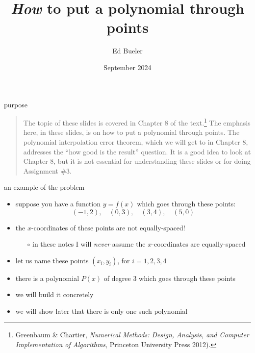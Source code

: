 \documentclass[10pt,hyperref]{beamer}
\title{\emph{How} to put a polynomial through points}
\author{Ed Bueler}
\institute{MATH 426 Numerical Analysis}
\date{September 2024}
\date{}
\begin{document}
\begin{frame}
  \maketitle
\end{frame}


\begin{frame}{purpose}
\begin{quote}
The topic of these slides is covered in Chapter 8 of the text.\footnote{Greenbaum \& Chartier, \emph{Numerical Methods: Design, Analysis, and Computer Implementation of Algorithms}, Princeton University Press 2012).}  The emphasis here, in these slides, is on \alert{how} to put a polynomial through points.  The polynomial interpolation error theorem, which we will get to in Chapter 8, addresses the ``how good is the result'' question.  It is a good idea to look at Chapter 8, but it is not essential for understanding these slides or for doing Assignment \#3.

\bigskip
\end{quote}
\end{frame}

\begin{frame}{an example of the problem}

\begin{itemize}
\item suppose you have a function $y=f(x)$ which goes through these points:
   $$(-1,2), \quad (0,3), \quad (3,4), \quad (5,0)$$
\item the $x$-coordinates of these points are not equally-spaced!
  \begin{itemize}
  \item[$\circ$]  in these notes I will \emph{never} assume the $x$-coordinates are equally-spaced
  \end{itemize}
\item let us name these points $(x_i,y_i)$, for $i=1,2,3,4$
\item there is a polynomial $P(x)$ of degree 3 which goes through these points
\item we will build it concretely
\item we will show later that there is only one such polynomial
\end{itemize}
\end{frame}
\end{document}
